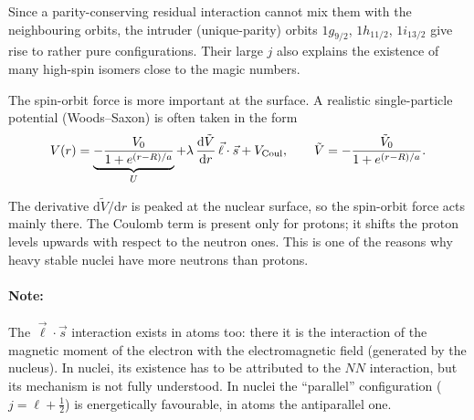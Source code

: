 \documentclass[11pt,a4paper]{article}
\newcommand{\ud}{\mathrm{d}}
\begin{document}
Since a parity-conserving residual interaction cannot mix them with the neighbouring orbits, the intruder (unique-parity) orbits $1g_{9/2}$, $1h_{11/2}$, $1i_{13/2}$ give rise to rather pure configurations. Their large $j$ also explains the existence of many high-spin isomers close to the magic numbers.


The spin-orbit force is more important at the surface. A realistic single-particle potential (Woods--Saxon) is often taken in the form
\[
V(r)=\underbrace{-\frac{V_0}{1+e^{(r-R)/a}}}_{U}+\lambda\,\frac{\ud\tilde V}{\ud r}\,\vec\ell\cdot\vec s+V_{\rm Coul},
\qquad
\tilde V=-\frac{\tilde V_0}{1+e^{(r-R)/a}} .
\]

The derivative $\ud\tilde V/\ud r$ is peaked at the nuclear surface, so the spin-orbit force acts mainly there. The Coulomb term is present only for protons; it shifts the proton levels upwards with respect to the neutron ones. This is one of the reasons why heavy stable nuclei have more neutrons than protons.

\begin{center}
\end{center}

\paragraph{Note:} The $\vec\ell\cdot\vec s$ interaction exists in atoms too: there it is the interaction of the magnetic moment of the electron with the electromagnetic field (generated by the nucleus). In nuclei, its existence has to be attributed to the $NN$ interaction, but its mechanism is not fully understood. In nuclei the ``parallel'' configuration ($j=\ell+\frac12$) is energetically favourable, in atoms the antiparallel one.
\end{document}
